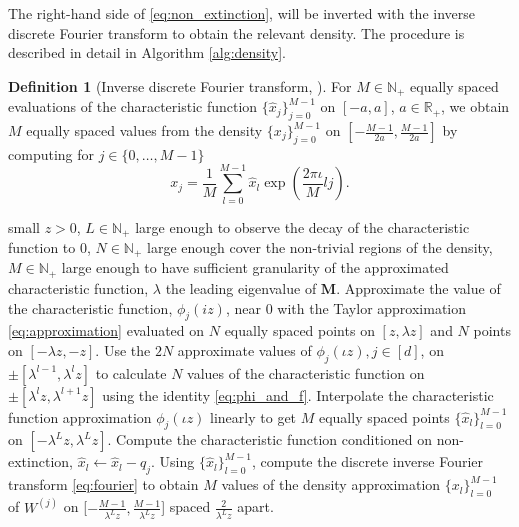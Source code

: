 \documentclass[preprint,3p,12pt]{elsarticle}
\theoremstyle{definition}
\newtheorem{definition}{Definition}
\begin{document}
The right-hand side of \eqref{eq:non_extinction}, will be inverted with the inverse discrete Fourier transform to obtain the relevant density. The procedure is described in detail in Algorithm \ref{alg:density}. 
\begin{definition}[Inverse discrete Fourier transform, \cite{fourier}]
     For $M \in \mathbb{N}_+$ equally spaced evaluations of the characteristic function $\{\hat{x}_j\}_{j=0}^{M-1}$ on $[-a, a]$, $a \in \mathbb{R}_+$, we obtain $M$ equally spaced values from the density $\{x_j\}_{j=0}^{M-1}$ on $[-\frac{M-1}{2a}, \frac{M-1}{2a}]$ by computing for $j \in \{0,\dots,M-1\}$
\begin{equation}
    x_j = \frac{1}{M} \sum_{l=0}^{M-1} \hat{x}_l \exp{\left(\frac{2\pi \iota}{M} lj\right)}. \label{eq:fourier}
\end{equation}
\end{definition}
\begin{algorithm}[t]
\caption{$W^{(j)}$ density approximation}
\label{alg:density}
\begin{algorithmic}[1]
\REQUIRE small $z > 0$, $L \in \mathbb{N}_+$ large enough to observe the decay of the characteristic function to 0, $N \in \mathbb{N}_+$ large enough cover the non-trivial regions of the density, $M \in \mathbb{N}_+$ large enough to have sufficient granularity of the approximated characteristic function, $\lambda$ the leading eigenvalue of $\boldsymbol{M}$.
\STATE Approximate the value of the characteristic function, $\phi_j(iz)$, near 0 with the Taylor approximation \eqref{eq:approximation} evaluated on $N$ equally spaced points on $[z, \lambda z]$ and $N$ points on $[ -\lambda z, -z]$. 
\ENDFOR
{}
    \STATE Use the $2N$ approximate values of $\phi_j(\iota z), j \in [d]$, on $\pm[\lambda^{l-1}, \lambda^{l} z]$ to calculate $N$ values of the characteristic function on $\pm[\lambda^{l}z, \lambda^{l+1} z]$ using the identity \eqref{eq:phi_and_f}. 
\ENDFOR
{}
\STATE Interpolate the characteristic function approximation $\phi_j(\iota z)$ linearly to get $M$ equally spaced points $\{\hat{x}_l\}_{l=0}^{M-1}$ on $[-\lambda^{L}z, \lambda^{L} z]$.
\STATE Compute the characteristic function conditioned on non-extinction, $\hat{x}_l \leftarrow \hat{x}_l  - q_j$.
\ENDFOR
\STATE Using $\{\hat{x}_l\}_{l=0}^{M-1}$, compute the discrete inverse Fourier transform \eqref{eq:fourier} to obtain $M$ values of the density approximation $\{x_l\}_{l=0}^{M-1}$ of $W^{(j)}$ on [$-\frac{M-1}{\lambda^L z}, \frac{M-1}{\lambda^L z}$] spaced $\frac{2}{\lambda^L z}$ apart.
\ENDFOR
\end{algorithmic}
\end{algorithm}
\end{document}
